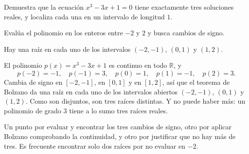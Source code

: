 
\begin{exercise}
Demuestra que la ecuación $x^3 - 3x + 1 = 0$ tiene exactamente tres
soluciones reales, y localiza cada una en un intervalo de longitud $1$.

\answerspace{6cm}

\begin{hint}
Evalúa el polinomio en los enteros entre $-2$ y $2$ y busca cambios de signo.
\end{hint}

\begin{answer}
Hay una raíz en cada uno de los intervalos $(-2, -1)$, $(0, 1)$ y $(1, 2)$.
\end{answer}

\begin{solution}
El polinomio $p(x) = x^3 - 3x + 1$ es continuo en todo $\mathbb{R}$, y
\[
  p(-2) = -1, \quad p(-1) = 3, \quad p(0) = 1, \quad p(1) = -1, \quad
  p(2) = 3 .
\]
Cambia de signo en $[-2, -1]$, en $[0, 1]$ y en $[1, 2]$, así que el teorema
de Bolzano da una raíz en cada uno de los intervalos abiertos $(-2, -1)$,
$(0, 1)$ y $(1, 2)$. Como son disjuntos, son tres raíces distintas. Y no
puede haber más: un polinomio de grado $3$ tiene a lo sumo tres raíces
reales.
\end{solution}

\begin{marking}
Un punto por evaluar y encontrar los tres cambios de signo, otro por aplicar
Bolzano comprobando la continuidad, y otro por justificar que no hay más de
tres. Es frecuente encontrar solo dos raíces por no evaluar en $-2$.
\end{marking}
\end{exercise}
